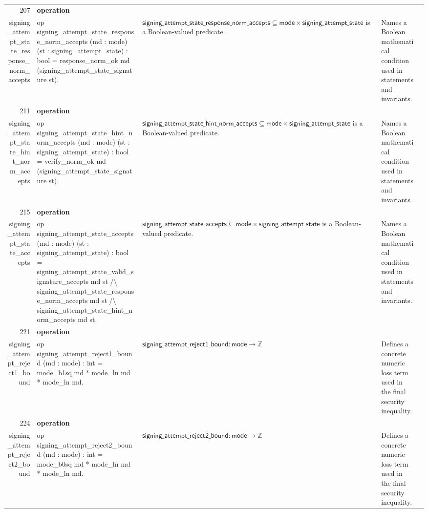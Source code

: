 \documentclass[10pt]{article}
\newcommand{\ec}[1]{\begingroup\ttfamily\scriptsize #1\endgroup}
\begin{document}
\begin{longtable}{r L{0.17\textwidth} L{0.26\textwidth} L{0.27\textwidth} L{0.20\textwidth}}
207 & \textbf{operation}\\\ec{signing\_attempt\_state\_response\_norm\_accepts} & \ec{op signing\_attempt\_state\_response\_norm\_accepts (md : mode) (st : signing\_attempt\_state) : bool = response\_norm\_ok md (signing\_attempt\_state\_signature st).} & \(\mathsf{signing\_attempt\_state\_response\_norm\_accepts} \subseteq \mathsf{mode} \times \mathsf{signing\_attempt\_state}\) is a Boolean-valued predicate. & Names a Boolean mathematical condition used in statements and invariants. \\
211 & \textbf{operation}\\\ec{signing\_attempt\_state\_hint\_norm\_accepts} & \ec{op signing\_attempt\_state\_hint\_norm\_accepts (md : mode) (st : signing\_attempt\_state) : bool = verify\_norm\_ok md (signing\_attempt\_state\_signature st).} & \(\mathsf{signing\_attempt\_state\_hint\_norm\_accepts} \subseteq \mathsf{mode} \times \mathsf{signing\_attempt\_state}\) is a Boolean-valued predicate. & Names a Boolean mathematical condition used in statements and invariants. \\
215 & \textbf{operation}\\\ec{signing\_attempt\_state\_accepts} & \ec{op signing\_attempt\_state\_accepts (md : mode) (st : signing\_attempt\_state) : bool = signing\_attempt\_state\_valid\_signature\_accepts md st /\textbackslash{} signing\_attempt\_state\_response\_norm\_accepts md st /\textbackslash{} signing\_attempt\_state\_hint\_norm\_accepts md st.} & \(\mathsf{signing\_attempt\_state\_accepts} \subseteq \mathsf{mode} \times \mathsf{signing\_attempt\_state}\) is a Boolean-valued predicate. & Names a Boolean mathematical condition used in statements and invariants. \\
221 & \textbf{operation}\\\ec{signing\_attempt\_reject1\_bound} & \ec{op signing\_attempt\_reject1\_bound (md : mode) : int = mode\_b1sq md * mode\_ln md * mode\_ln md.} & \(\mathsf{signing\_attempt\_reject1\_bound} : \mathsf{mode} \to \mathbb{Z}\) & Defines a concrete numeric loss term used in the final security inequality. \\
224 & \textbf{operation}\\\ec{signing\_attempt\_reject2\_bound} & \ec{op signing\_attempt\_reject2\_bound (md : mode) : int = mode\_b0sq md * mode\_ln md * mode\_ln md.} & \(\mathsf{signing\_attempt\_reject2\_bound} : \mathsf{mode} \to \mathbb{Z}\) & Defines a concrete numeric loss term used in the final security inequality. \\

\end{longtable}
\end{document}
